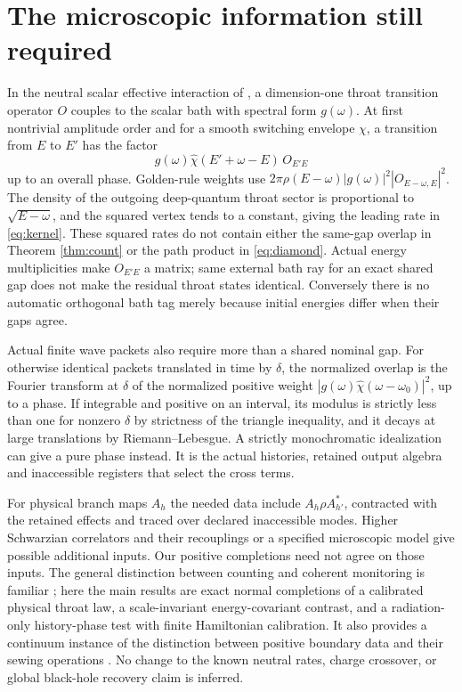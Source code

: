 \documentclass[11pt]{article}
\begin{document}
\section{The microscopic information still required}
In the neutral scalar effective interaction of \cite{brown,biggs}, a dimension-one throat transition operator \(O\) couples to the scalar bath with spectral form \(g(\omega)\). At first nontrivial amplitude order and for a smooth switching envelope \(\chi\), a transition from \(E\) to \(E'\) has the factor
\[
       g(\omega)\widehat\chi(E'+\omega-E)\,O_{E'E}
\]
up to an overall phase. Golden-rule weights use \(2\pi\rho(E-\omega)|g(\omega)|^2|O_{E-\omega,E}|^2\). The density of the outgoing deep-quantum throat sector is proportional to \(\sqrt{E-\omega}\), and the squared vertex tends to a constant, giving the leading rate in \eqref{eq:kernel}. These squared rates do not contain either the same-gap overlap in Theorem \ref{thm:count} or the path product in \eqref{eq:diamond}. Actual energy multiplicities make \(O_{E'E}\) a matrix; same external bath ray for an exact shared gap does not make the residual throat states identical. Conversely there is no automatic orthogonal bath tag merely because initial energies differ when their gaps agree.

Actual finite wave packets also require more than a shared nominal gap. For otherwise identical packets translated in time by \(\delta\), the normalized overlap is the Fourier transform at \(\delta\) of the normalized positive weight \(|g(\omega)\widehat\chi(\omega-\omega_0)|^2\), up to a phase. If integrable and positive on an interval, its modulus is strictly less than one for nonzero \(\delta\) by strictness of the triangle inequality, and it decays at large translations by Riemann--Lebesgue. A strictly monochromatic idealization can give a pure phase instead. It is the actual histories, retained output algebra and inaccessible registers that select the cross terms.

For physical branch maps \(A_h\) the needed data include \(A_h\rho A_{h'}^*\), contracted with the retained effects and traced over declared inaccessible modes. Higher Schwarzian correlators and their recouplings \cite{mtv} or a specified microscopic model give possible additional inputs. Our positive completions need not agree on those inputs. The general distinction between counting and coherent monitoring is familiar \cite{gm}; here the main results are exact normal completions of a calibrated physical throat law, a scale-invariant energy-covariant contrast, and a radiation-only history-phase test with finite Hamiltonian calibration. It also provides a continuum instance of the distinction between positive boundary data and their sewing operations \cite{paper18}. No change to the known neutral rates, charge crossover, or global black-hole recovery claim is inferred.
\end{document}
